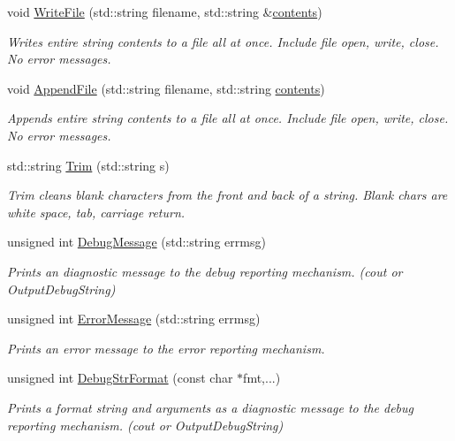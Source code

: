 \begin{DoxyCompactItemize}
void \hyperlink{classCGlobals_aaba4dc868620e6714f96339f873db4d6}{Write\-File} (std\-::string filename, std\-::string \&\hyperlink{SanityCheckTests_8cpp_aed76f8804515a6923e39ee3257c3fb52}{contents})
\begin{DoxyCompactList}\small\item\em Writes entire string contents to a file all at once. Include file open, write, close. No error messages. \end{DoxyCompactList}\item 
void \hyperlink{classCGlobals_a7876537cd390030c33daa30f43c2070c}{Append\-File} (std\-::string filename, std\-::string \hyperlink{SanityCheckTests_8cpp_aed76f8804515a6923e39ee3257c3fb52}{contents})
\begin{DoxyCompactList}\small\item\em Appends entire string contents to a file all at once. Include file open, write, close. No error messages. \end{DoxyCompactList}\item 
std\-::string \hyperlink{classCGlobals_aba6226926f731d175e54efa0dec2833b}{Trim} (std\-::string s)
\begin{DoxyCompactList}\small\item\em Trim cleans blank characters from the front and back of a string. Blank chars are white space, tab, carriage return. \end{DoxyCompactList}\item 
unsigned int \hyperlink{classCGlobals_af8125cf019b0b2fec19a53b76bb9d57e}{Debug\-Message} (std\-::string errmsg)
\begin{DoxyCompactList}\small\item\em Prints an diagnostic message to the debug reporting mechanism. (cout or Output\-Debug\-String) \end{DoxyCompactList}\item 
unsigned int \hyperlink{classCGlobals_a4e5323745d12ff5eab9b12e0e42bd1dc}{Error\-Message} (std\-::string errmsg)
\begin{DoxyCompactList}\small\item\em Prints an error message to the error reporting mechanism. \end{DoxyCompactList}\item 
unsigned int \hyperlink{classCGlobals_a9ee96ec24bdb9d8606b540e684384649}{Debug\-Str\-Format} (const char $\ast$fmt,...)
\begin{DoxyCompactList}\small\item\em Prints a format string and arguments as a diagnostic message to the debug reporting mechanism. (cout or Output\-Debug\-String) \end{DoxyCompactList}\item 

\end{DoxyCompactItemize}

